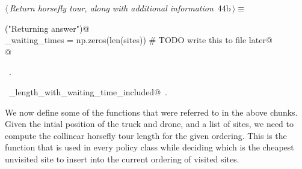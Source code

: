 \documentclass[11.5pt]{report}
\begin{document}
\begin{flushleft} \small\label{scrap62}\raggedright\small
{} $\langle\,${\itshape Return horsefly tour, along with additional information}\nobreak\ {\footnotesize {44b}}$\,\rangle\equiv$
\vspace{-1ex}
\begin{list}{}{} \item
\mbox{}\verb@debug("Returning answer")@\\
\mbox{}\verb@horse_waiting_times = np.zeros(len(sites)) # TODO write this to file later@\\
\mbox{}@\\
\mbox{}\verb@@{\NWsep}
\end{list}
\vspace{-1.5ex}
\footnotesize
\begin{list}{}{\setlength{\itemsep}{-\parsep}\setlength{\itemindent}{-\leftmargin}}
\item \NWtxtMacroRefIn\ .
\item \NWtxtIdentsUsed\nobreak\  \verb@tour_length_with_waiting_time_included@\nobreak\ .
\item{}
\end{list}
\vspace{4ex}
\end{flushleft}

\vspace{-0.8cm}\newchunk We now define some of the functions that were referred to in the above chunks. 
Given the intial position of the truck and drone, and a list of sites, we need to compute 
the collinear horsefly tour length for the given ordering. This is the function that is 
used in every policy class while deciding which is the cheapest unvisited site to insert 
into the current ordering of visited sites. 
\end{document}
